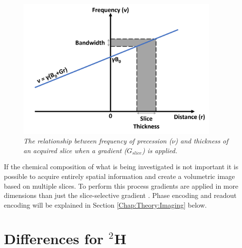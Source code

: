 \begin{figure}
    \centering
    \includegraphics[width=0.9\textwidth]{Figures/Theory/Gradient.png}
    \caption{\textit{The relationship between frequency of precession ($\nu$) and thickness of an acquired slice when a gradient ($G_{slice}$) is applied.}}
    \label{fig:theory:Grad}
\end{figure}

If the chemical composition of what is being investigated is not important it is possible to acquire entirely spatial information and create a volumetric image based on multiple slices. To perform this process gradients are applied in more dimensions than just the slice-selective gradient \cite{deGraaf2019InSpectroscopy}. Phase encoding and readout encoding will be explained in Section \ref{Chap:Theory:Imaging} below.

\section{Differences for \texorpdfstring{$^2$H}{2H}}

